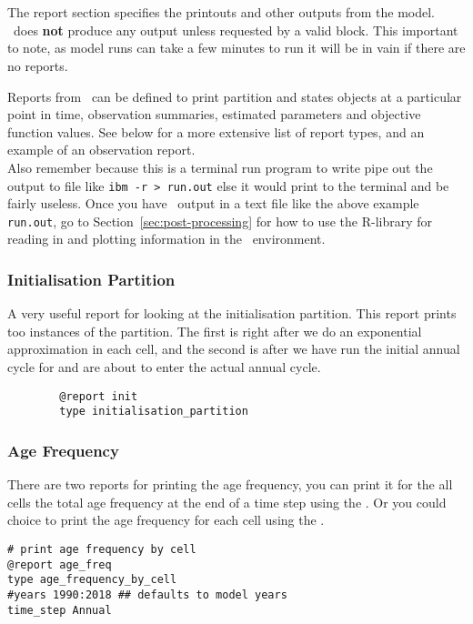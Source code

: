 \section{\label{sec:report-section}}
The report section specifies the printouts and other outputs from the model. \IBM\ does \textbf{not} produce any output unless requested by a valid  block. This important to note, as model runs can take a few minutes to run it will be in vain if there are no reports.

Reports from \IBM\ can be defined to print partition and states objects at a particular point in time, observation summaries, estimated parameters and objective function values. See below for a more extensive list of report types, and an example of an observation report.\\

Also remember because this is a terminal run program to write pipe out the output to file like \texttt{ibm -r > run.out} else it would print to the terminal and be fairly useless. Once you have \IBM\ output in a text file like the above example \texttt{run.out}, go to Section~\ref{sec:post-processing} for how to use the R-library for reading in and plotting information in the \R\ environment.


\subsubsection{Initialisation Partition}
A very useful report for looking at the initialisation partition. This report prints too instances of the partition. The first is right after we do an exponential approximation in each cell, and the second is after we have run the initial annual cycle for  and are about to enter the actual annual cycle.

{\small{\begin{verbatim}
		@report init
		type initialisation_partition
\end{verbatim}}}


\subsubsection{Age Frequency}
There are two reports for printing the age frequency, you can print it for the all cells the total age frequency at the end of a time step using the  . Or you could choice to print the age frequency for each cell using the  . 
{\small{\begin{verbatim}
# print age frequency by cell
@report age_freq
type age_frequency_by_cell
#years 1990:2018 ## defaults to model years
time_step Annual
\end{verbatim}}}

